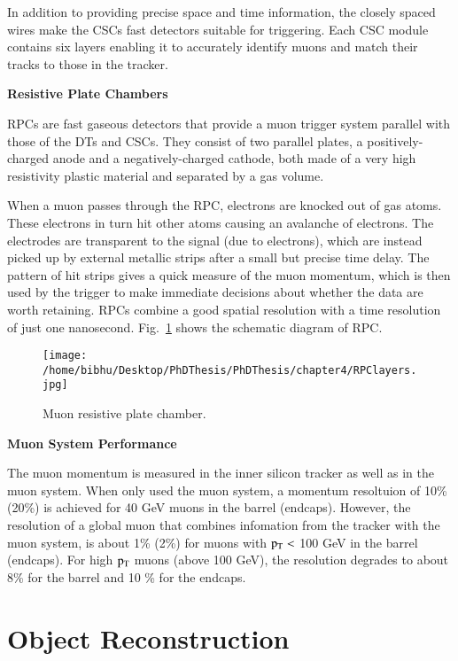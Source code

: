 In addition to providing precise space and time information, the closely spaced wires make the CSCs fast detectors suitable for triggering. Each CSC module contains six layers enabling it to accurately identify muons and match their tracks to those in the tracker. 


{\bf Resistive Plate Chambers}

RPCs are fast gaseous detectors that provide a muon trigger system parallel with those of the DTs and CSCs. They consist of two parallel plates, a positively-charged anode and a negatively-charged cathode, both made of a very high resistivity plastic material and separated by a gas volume.

When a muon passes through the RPC, electrons are knocked out of gas atoms. These electrons in turn hit other atoms causing an avalanche of electrons. The electrodes are transparent to the signal (due to electrons), which are instead picked up by external metallic strips after a small but precise time delay. The pattern of hit strips gives a quick measure of the muon momentum, which is then used by the trigger to make immediate decisions about whether the data are worth retaining. RPCs combine a good spatial resolution with a time resolution of just one nanosecond. Fig.~\ref{fig:CMSmuonRPC} shows the schematic diagram of RPC.


\begin{figure}[H]
    \centering
    \texttt{[image: /home/bibhu/Desktop/PhDThesis/PhDThesis/chapter4/RPClayers.jpg]}
    \caption{ \small Muon resistive plate chamber.}
    \label{fig:CMSmuonRPC}
\end{figure}

{\bf Muon System Performance}

The muon momentum is measured in the inner silicon tracker as well as in the muon system. When only used the muon system, a momentum resoltuion of 10\% (20\%) is achieved for 40 GeV muons in the barrel (endcaps). However, the resolution of a global muon that combines infomation from the tracker with the muon system, is about 1\% (2\%) for muons with $\rm p_{T} <$ 100 GeV in the barrel (endcaps). For high $\rm p_{T}$ muons (above 100 GeV), the resolution degrades to about 8\% for the barrel and 10 \% for the endcaps.





\section{Object Reconstruction}

